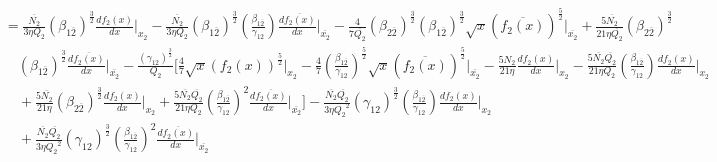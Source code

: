 \documentclass[fleqn, 10pt]{article}
\begin{document}
            \begin{equation*}
            \begin{split}
            &=  \frac{\overline{N_2}}{3 \eta Q_2} (\beta_{1\overline{2}})^\frac{3}{2} \frac{df_2(x)}{dx} \Bigg|_{x_2} -   \frac{\overline{N_2}}{3 \eta Q_2} (\beta_{1\overline{2}})^\frac{3}{2} \left(\frac{\beta_{1\overline{2}}}{\gamma_{12}}\right) \frac{d\overline{f_2(x)}}{dx} \Bigg|_{\overline{x_2}} -   \frac{4}{7 \overline{Q_2}} (\beta_{2\overline{2}})^\frac{3}{2} (\beta_{1\overline{2}})^\frac{3}{2} \sqrt{x} (\overline{f_2(x)})^\frac{5}{2} \Bigg|_{\overline{x_2}} +   \frac{5 \overline{N_2}}{21 \eta \overline{Q_2}} (\beta_{2\overline{2}})^\frac{3}{2} \\ & \quad (\beta_{1\overline{2}})^\frac{3}{2} \frac{d\overline{f_2(x)}}{dx} \Bigg|_{\overline{x_2}} -   \frac{(\gamma_{12})^\frac{3}{2}}{Q_2} \Biggl[ \frac{4}{7} \sqrt{x} (f_2(x))^\frac{5}{2} \Bigg|_{x_2} -   \frac{4}{7} \left(\frac{\beta_{1\overline{2}}}{\gamma_{12}}\right)^\frac{5}{2} \sqrt{x} (\overline{f_2(x)})^\frac{5}{2} \Bigg|_{\overline{x_2}} -   \frac{5N_2}{21 \eta} \frac{df_2(x)}{dx} \Bigg|_{x_2} -  \frac{5 \overline{N_2} \overline{Q_2}}{21 \eta Q_2} \left(\frac{\beta_{1\overline{2}}}{\gamma_{12}}\right) \frac{df_2(x)}{dx} \Bigg|_{x_2} \\ & \quad +  \frac{5 \overline{N_2}}{21 \eta} (\beta_{2\overline{2}})^\frac{3}{2} \frac{df_2(x)}{dx}\Bigg|_{x_2} +   \frac{5 \overline{N_2} \overline{Q_2}}{21 \eta Q_2} \left(\frac{\beta_{1\overline{2}}}{\gamma_{12}}\right)^2 \frac{d\overline{f_2(x)}}{dx} \Bigg|_{\overline{x_2}} \Biggr] -   \frac{\overline{N_2} \overline{Q_2}}{3 \eta {Q_2}^2} (\gamma_{12})^\frac{3}{2} \left(\frac{\beta_{1\overline{2}}}{\gamma_{12}}\right) \frac{df_2(x)}{dx} \Bigg|_{x_2} \\ & \quad +  \frac{\overline{N_2} \overline{Q_2}}{3 \eta {Q_2}^2} (\gamma_{12})^\frac{3}{2} \left(\frac{\beta_{1\overline{2}}}{\gamma_{12}}\right)^2 \frac{d\overline{f_2(x)}}{dx} \Bigg|_{\overline{x_2}}
            \end{split}
            \end{equation*}
\end{document}

